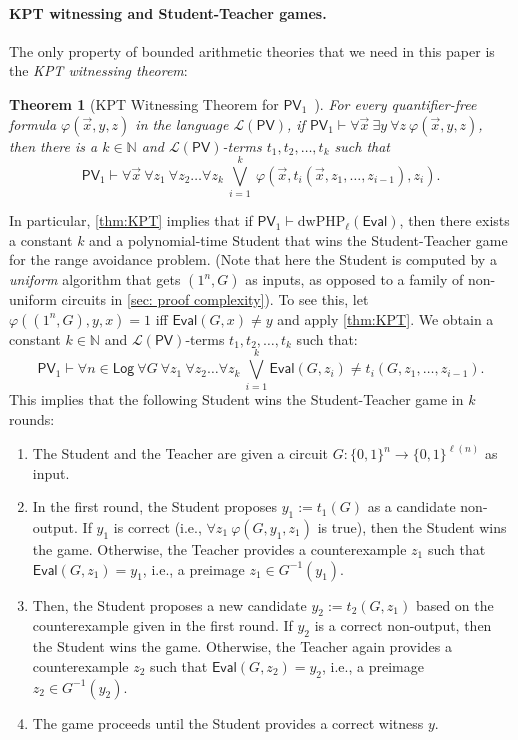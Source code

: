 \documentclass[10pt,a4paper]{article}
\newtheorem{theorem}{Theorem}[section]
\theoremstyle{definition}
\theoremstyle{remark}
\newcommand{\dwPHP}{\mathrm{dwPHP}}
\newcommand{\PV}{\mathsf{PV}}
\newcommand{\calL}{\mathcal{L}}
\newcommand{\N}{\mathbb{N}}
\newcommand{\Eval}{\mathsf{Eval}}%
\begin{document}
\paragraph{KPT witnessing and Student-Teacher games.} The only property of bounded arithmetic theories that we need in this paper is the \emph{KPT witnessing theorem}:


\begin{theorem}[{KPT Witnessing Theorem for $\PV_1$~\cite{KRAJICEK1991143}}]\label{thm:KPT}
    For every quantifier-free formula $\varphi(\vec{x},y,z)$ in the language $\calL(\PV)$, if $\PV_1 \vdash \forall \vec{x}~\exists y~\forall z~\varphi(\vec{x},y,z)$, then there is a $k\in \N$ and $\calL(\PV)$-terms $t_1,t_2,\dots,t_k$ such that
    \begin{equation}\label{eqn:KPT}
        \PV_1 \vdash \forall \vec{x}~\forall z_1~\forall z_2 \dots \forall z_k~\bigvee_{i=1}^k~\varphi(\vec{x},t_i(\vec{x},z_1,\dots,z_{i-1}),z_i).
    \end{equation}
\end{theorem}

In particular, \autoref{thm:KPT} implies that if $\PV_1\vdash \dwPHP_\ell(\Eval)$, then there exists a constant $k$ and a polynomial-time Student that wins the Student-Teacher game for the range avoidance problem. (Note that here the Student is computed by a \emph{uniform} algorithm that gets $(1^n, G)$ as inputs, as opposed to a family of non-uniform circuits in \autoref{sec: proof complexity}). To see this, let $\varphi((1^n, G), y, x) = 1$ iff $\Eval(G, x) \ne y$ and apply \autoref{thm:KPT}. We obtain a constant $k\in \N$ and $\calL(\PV)$-terms $t_1, t_2, \dots, t_k$ such that:
\begin{equation}\label{eq: KPT-Avoid}
    \PV_1\vdash \forall n\in\mathsf{Log}~\forall G~\forall z_1~\forall z_2 \dots \forall z_k~\bigvee_{i=1}^k \Eval(G, z_i) \ne t_i(G, z_1, \dots, z_{i-1}).
\end{equation}
This implies that the following Student wins the Student-Teacher game in $k$ rounds:\begin{enumerate}
    \item The Student and the Teacher are given a circuit $G: \{0, 1\}^n \to \{0, 1\}^{\ell(n)}$ as input.
    \item In the first round, the Student proposes $y_1 :=t_1(G)$ as a candidate non-output. If $y_1$ is correct (i.e., $\forall z_1~\varphi(G, y_1, z_1)$ is true), then the Student wins the game. Otherwise, the Teacher provides a counterexample $z_1$ such that $\Eval(G, z_1) = y_1$, i.e., a preimage $z_1\in G^{-1}(y_1)$.
    \item Then, the Student proposes a new candidate $y_2 := t_2(G, z_1)$ based on the counterexample given in the first round. If $y_2$ is a correct non-output, then the Student wins the game. Otherwise, the Teacher again provides a counterexample $z_2$ such that $\Eval(G, z_2) = y_2$, i.e., a preimage $z_2 \in G^{-1}(y_2)$.
    \item The game proceeds until the Student provides a correct witness $y$.
\end{enumerate}
\end{document}
